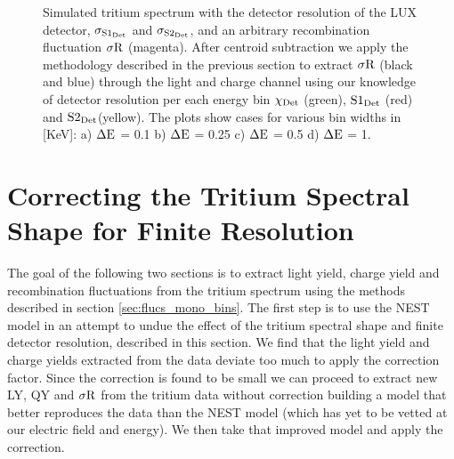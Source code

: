 \begin{figure}[h!]
\caption{Simulated tritium spectrum with the detector resolution of the LUX detector, $\rm \sigma_{S1_{Det}}$ and $\rm \sigma_{S2_{Det}}$, and an arbitrary recombination fluctuation $\rm \sigma R$ (magenta). After centroid subtraction we apply the methodology described in the previous section to extract $\rm \sigma R$ (black and blue) through the light and charge channel using our knowledge of detector resolution per each energy bin $\rm \chi_{Det}$ (green), $\rm S1_{Det}$ (red) and $\rm S2_{Det} $(yellow). The plots show cases for various bin widths in [KeV]: a) $\rm \Delta E$ = 0.1 b) $\rm \Delta E$ = 0.25 c) $\rm \Delta E$ = 0.5 d) $\rm \Delta E$ = 1.   }
\label{fig:T_Var}
\end{figure}%


\newpage
\section{Correcting the Tritium Spectral Shape for Finite Resolution}
\label{sec:Smear}

The goal of the following two sections is to extract light yield, charge yield and recombination fluctuations from the tritium spectrum using the methods described in section \ref{sec:flucs_mono_bins}. The first step is to use the NEST model in an attempt to undue the effect of the tritium spectral shape and finite detector resolution, described in this section. We find that the light yield and charge yields extracted from the data deviate too much to apply the correction factor. Since the correction is found to be small we can proceed to extract new LY, QY and $\rm \sigma R$ from the tritium data without correction building a model that better reproduces the data than the NEST model (which has yet to be vetted at our electric field and energy). We then take that improved model and apply the correction.
 

